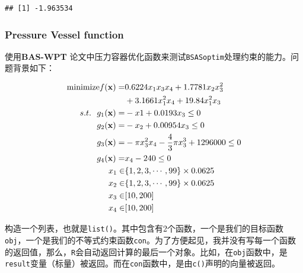 \documentclass[]{ctexbook}
\theoremstyle{definition}
\theoremstyle{definition}
\theoremstyle{definition}
\theoremstyle{remark}
\begin{document}
\begin{verbatim}
## [1] -1.963534
\end{verbatim}

\subsubsection{Pressure Vessel function}\label{BSASpv}

使用\textbf{BAS-WPT}\citep{Jiangwpt}
论文中压力容器优化函数来测试\texttt{BSASoptim}处理约束的能力。问题背景如下：

\begin{align}
\text{minimize} f(\mathbf{x}) = &0.6224x_1x_3x_4+1.7781x_2x^2_3 \notag\\
&+3.1661x^2_1x_4 + 19.84x^2_1x_3 \notag \\
s.t. ~~ g_1(\mathbf{x}) = & -x1 + 0.0193x_3 \leq 0 \notag \\
g_2(\mathbf{x}) = & -x_2 + 0.00954x_3 \leq 0 \notag \\
g_3(\mathbf{x}) = & -\pi x^2_3x_4 -\frac{4}{3}\pi x^3_3 + 1296000 \leq 0 \notag \\
g_4(\mathbf{x}) = & x_4-240\leq 0 \notag \\
x_1 \in& \{1,2,3,\cdots,99\}\times0.0625 \notag \\
x_2 \in& \{1,2,3,\cdots,99\}\times0.0625 \notag \\
x_3 \in& [10,200] \notag \\
x_4 \in& [10,200] \notag \\
\label{eq:PV}
\end{align}

构造一个列表，也就是\texttt{list()}。其中包含有2个函数，一个是我们的目标函数\texttt{obj}，一个是我们的不等式约束函数\texttt{con}。为了方便起见，我并没有写每一个函数的返回值，那么，\texttt{R}会自动返回计算的最后一个对象。比如，在\texttt{obj}函数中，是\texttt{result}变量（标量）被返回。而在\texttt{con}函数中，是由\texttt{c()}声明的向量被返回。
\end{document}
